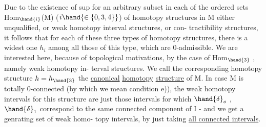 Due to the existence of  sup for an arbitrary subset\hand{,} in
each of the ordered sets Hom$_{\hand{i}}$(M) ($i\hand{\in\{0,3,4\}}$) of homotopy structures in
M \hand{(} either unqualified, or weak homotopy interval structures, or con-%
tractibility structures\hand{)}, it follows that for each of these three types
of homotopy structures, there is a widest one $h_i$ among all those of
this type, which are 0-admissible. We are interested here, because of
topological motivations, by the case of Hom$_{\hand{3}}$ , namely weak homotopy in-%
terval structures. We call the corresponding homotopy structure $h=h_{\hand{3}}$
the \uline{canonical} \uline{homotopy} \uline{structure} of M. In case M is totally 0-connected
(by which we mean condition e)), the weak homotopy intervals for this
structure are just those intervals for which $\hand{\delta}_o$ , $\hand{\delta}_1$ correspond to the
same connected component of I - and we get a genrating set of weak homo-%
topy intervals, by just taking \uline{all connected intervals}. 

